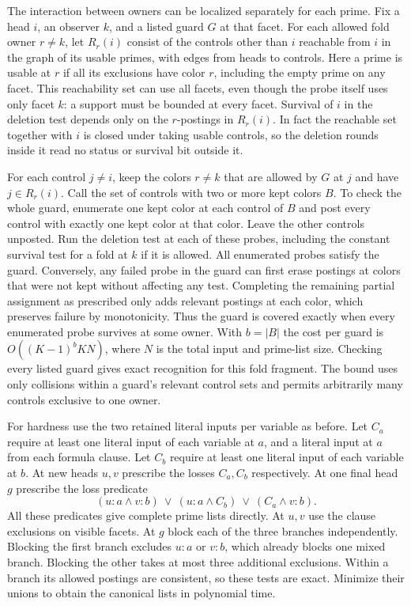The interaction between owners can be localized separately for
each prime. Fix a head $i$, an observer $k$, and a listed guard $G$
at that facet. For each allowed fold owner $r\ne k$, let $R_r(i)$
consist of the controls other than $i$ reachable from $i$ in the
graph of its usable primes, with edges from heads to controls.
Here a prime is usable at $r$ if all its exclusions have color
$r$, including the empty prime on any facet. This reachability
set can use all facets, even though the probe itself uses only
facet $k$: a support must be bounded at every facet. Survival of
$i$ in the deletion test depends only on the $r$-postings in
$R_r(i)$. In fact the reachable set together with $i$ is closed
under taking usable controls, so the deletion rounds inside it
read no status or survival bit outside it.

For each control $j\ne i$, keep the colors $r\ne k$ that are
allowed by $G$ at $j$ and have $j\in R_r(i)$. Call the set of
controls with two or more kept colors $B$. To check the whole
guard, enumerate one kept color at each control of $B$ and
post every control with exactly one kept color at that color.
Leave the other controls unposted. Run the deletion test at
each of these probes, including the constant survival test
for a fold at $k$ if it is allowed. All enumerated probes
satisfy the guard. Conversely, any failed probe in the guard
can first erase postings at colors that were not kept without
affecting any test. Completing the remaining partial assignment
as prescribed only adds relevant postings at each color, which
preserves failure by monotonicity. Thus the guard is covered
exactly when every enumerated probe survives at some owner.
With $b=|B|$ the cost per guard is $O((K-1)^b K N)$, where
$N$ is the total input and prime-list size. Checking every
listed guard gives exact recognition for this fold fragment.
The bound uses only collisions within a guard's relevant
control sets and permits arbitrarily many controls exclusive
to one owner.

For hardness use the two retained literal inputs per
variable as before. Let $C_a$ require at least one literal
input of each variable at $a$, and a literal input at $a$
from each formula clause. Let $C_b$ require at least one
literal input of each variable at $b$. At new heads $u,v$
prescribe the losses $C_a,C_b$ respectively. At one final
head $g$ prescribe the loss predicate
\[
  (u:a\land v:b)\ \lor\ (u:a\land C_b)\ \lor\ (C_a\land v:b).
\]
All these predicates give complete prime lists directly.
At $u,v$ use the clause exclusions on visible facets. At $g$
block each of the three branches independently. Blocking the
first branch excludes $u:a$ or $v:b$, which already blocks
one mixed branch. Blocking the other takes at most three
additional exclusions. Within a branch its allowed postings
are consistent, so these tests are exact. Minimize their
unions to obtain the canonical lists in polynomial time.

